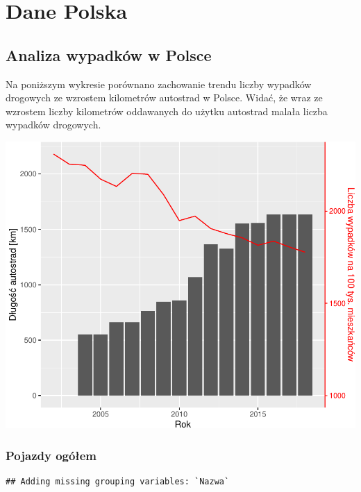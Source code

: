 \documentclass[
]{article}
\begin{document}
\hypertarget{dane-polska}{%
\section{Dane Polska}\label{dane-polska}}

\hypertarget{analiza-wypadkuxf3w-w-polsce}{%
\subsection{Analiza wypadków w
Polsce}\label{analiza-wypadkuxf3w-w-polsce}}

Na poniższym wykresie porównano zachowanie trendu liczby wypadków
drogowych ze wzrostem kilometrów autostrad w Polsce. Widać, że wraz ze
wzrostem liczby kilometrów oddawanych do użytku autostrad malała liczba
wypadków drogowych.

\begin{flushleft}\includegraphics{raport_wypadki_files/figure-latex/pressure-1} \end{flushleft}

\hypertarget{pojazdy-oguxf3ux142em}{%
\subsubsection{Pojazdy ogółem}\label{pojazdy-oguxf3ux142em}}

\begin{verbatim}
## Adding missing grouping variables: `Nazwa`
\end{verbatim}
\end{document}
